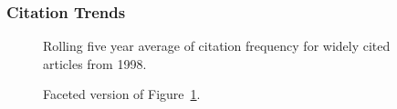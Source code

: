 \documentclass[
  10pt,
  letterpaper,
  DIV=11,
  numbers=noendperiod,
  twoside]{scrartcl}
\begin{document}
\subsubsection*{Citation Trends}\label{citation-trends-22}

\begin{figure}


\caption{\label{fig-citation-spaghetti-1998}Rolling five year average of
citation frequency for widely cited articles from 1998.}

\end{figure}%

\begin{figure}


\caption{\label{fig-citation-facet-1998}Faceted version of
Figure~\ref{fig-citation-spaghetti-1998}.}

\end{figure}%
\end{document}
